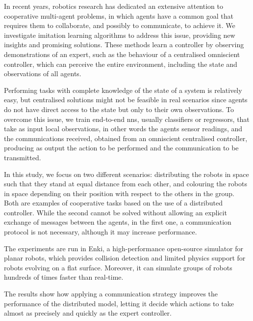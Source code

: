 In recent years, robotics research has dedicated an extensive attention to 
cooperative multi-agent problems, in which agents have a common goal that 
requires them to collaborate, and possibly to communicate, to achieve it.
We investigate imitation learning algorithms to address this issue, providing new 
insights and promising solutions. 
These methods learn a controller by observing demonstrations of an expert, such 
as the behaviour of a centralised omniscient controller, which can perceive the 
entire environment, including the state and observations of all agents. 

Performing tasks with complete knowledge of the state of a system is relatively 
easy, but centralised solutions might not be feasible in real scenarios since agents 
do not have direct access to the state but only to their own observations.
To overcome this issue, we train end-to-end \glspl{nn}, usually classifiers or 
regressors, that take as input local observations, in other words the agents sensor 
readings, and the communications received, obtained from an omniscient 
centralised controller, producing as output the action to be performed and the 
communication to be transmitted.

In this study, we focus on two different scenarios: distributing the robots in space 
such that they stand at equal distance from each other, and colouring the robots 
in space depending on their position with respect to the others in the group.
Both are examples of cooperative tasks based on the use of a distributed 
controller. While the second cannot be solved without allowing an explicit 
exchange of messages between the agents, in the first one, a communication 
protocol is not necessary, although it may increase performance.

The experiments are run in Enki, a high-performance open-source simulator for 
planar robots, which provides collision detection and limited physics support for 
robots evolving on a flat surface. Moreover, it can simulate groups of robots 
hundreds of times faster than real-time.


The results show how applying a communication strategy improves the 
performance of the distributed model, letting it decide which actions to take 
almost as precisely and quickly as the expert controller.